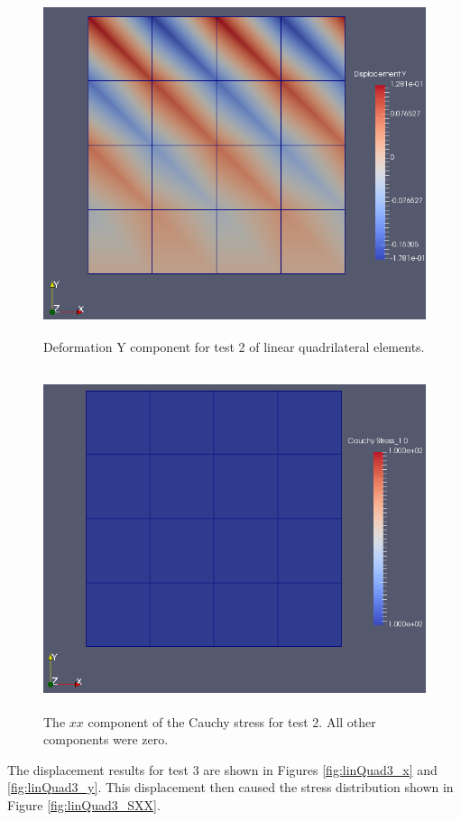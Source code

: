 \documentclass[a4paper, 12pt]{article}
\begin{document}
\begin{figure}[H]
  \centering
  \includegraphics[width=13cm, height=10cm]{quad_4_t2_disp_Y}
  \caption{Deformation Y component for test 2 of linear 
            quadrilateral elements.}
  \label{fig:linQuad2_y}
\end{figure}

\begin{figure}[H]
  \centering
  \includegraphics[width=13cm, height=10cm]{quad_4_t2_Sxx}
  \caption{The $xx$ component of the Cauchy stress for test 2.
            All other components were zero.}
  \label{fig:linQuad2_SXX}
\end{figure}

The displacement results for test 3 are shown in 
Figures \ref{fig:linQuad3_x} and \ref{fig:linQuad3_y}.
This displacement then caused the stress distribution 
shown in Figure \ref{fig:linQuad3_SXX}.
\end{document}
